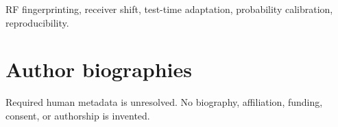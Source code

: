 \documentclass[nolineno]{ieeeaccess}
\begin{document}
\doi{}
\title{\studytitle}
\author{\uppercase{OpenEW-SA Internal Review}}
\address{Authors and affiliations require human confirmation.}
\tfootnote{\draftnotice}

\begin{keywords}RF fingerprinting, receiver shift, test-time adaptation, probability calibration, reproducibility.\end{keywords}
\maketitle


\section*{Author biographies}
Required human metadata is unresolved. No biography, affiliation, funding, consent, or authorship is invented.
\EOD
\end{document}
